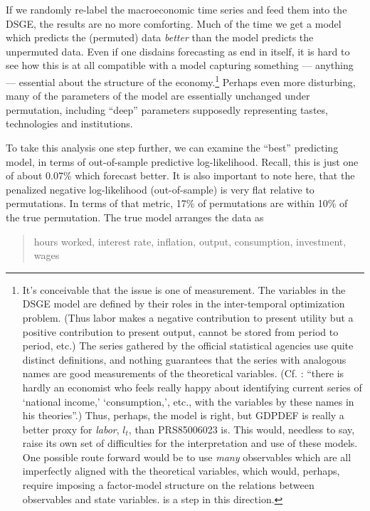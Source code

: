 \documentclass[11pt]{article}
\begin{document}
If we randomly re-label the macroeconomic time series and feed them into
the DSGE, the results are no more comforting. Much of the time we get a
model which predicts the (permuted) data \emph{better} than the model
predicts the unpermuted data. Even if one disdains forecasting as end in
itself, it is hard to see how this is at all compatible with a model
capturing something --- anything --- essential about the structure of
the economy.\footnote{It's conceivable that the issue is one of
  measurement. The variables in the DSGE model are defined by their
  roles in the inter-temporal optimization problem. (Thus labor makes a
  negative contribution to present utility but a positive contribution
  to present output, cannot be stored from period to period, etc.) The
  series gathered by the official statistical agencies use quite
  distinct definitions, and nothing guarantees that the series with
  analogous names are good measurements of the theoretical variables.
  (Cf. \citet[p. 6]{Haavelmo-probability-approach}: ``there is hardly an
  economist who feels really happy about identifying current series of
  `national income,' `consumption,', etc., with the variables by these
  names in his theories''.) Thus, perhaps, the model is right, but
  GDPDEF is really a better proxy for \emph{labor}, \(l_t\), than
  PRS85006023 is. This would, needless to say, raise its own set of
  difficulties for the interpretation and use of these models. One
  possible route forward would be to use \emph{many} observables which
  are all imperfectly aligned with the theoretical variables, which
  would, perhaps, require imposing a factor-model structure on the
  relations between observables and state variables.
  \citet{Boivin-Giannoni-DSGEs-in-data-rich-environment} is a step in
  this direction.} Perhaps even more disturbing, many of the parameters
of the model are essentially unchanged under permutation, including
``deep'' parameters supposedly representing tastes, technologies and
institutions.

To take this analysis one step further, we can examine the ``best''
predicting model, in terms of out-of-sample predictive log-likelihood.
Recall, this is just one of about 0.07\% which forecast better. It is
also important to note here, that the penalized negative log-likelihood
(out-of-sample) is very flat relative to permutations. In terms of that
metric, 17\% of permutations are within 10\% of the true permutation.
The true model arranges the data as

\begin{quotation}
hours worked, interest rate, inflation, output, consumption, investment, wages
\end{quotation}
\end{document}
